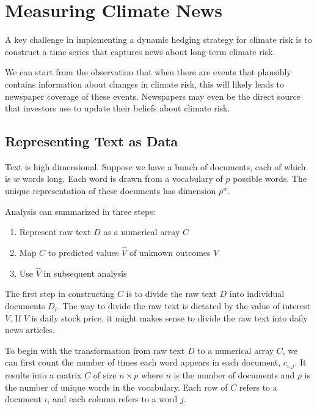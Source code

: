 \chapter{Measuring Climate News}

A key challenge in implementing a dynamic 
hedging strategy for climate risk is to 
construct a time series that captures 
news about long-term climate risk.

We can start from the observation that 
when there are events that 
plausibly contains information about changes 
in climate risk, this will likely leads 
to newspaper coverage of these events.
Newspapers may even be the direct source 
that investors use to update their beliefs
about climate risk.

\section{Representing Text as Data}
 
Text is high dimensional. 
Suppose we have a bunch of documents, each of 
which is $w$ words long. Each word is 
drawn from a vocabulary of $p$ possible 
words. The unique representation of these 
documents has dimension $p^w$. 

Analysis can 
summarized in three steps:

\begin{enumerate}
    \item Represent raw text $D$ as a numerical 
    array $C$
    \item Map $C$ to predicted 
    values $\hat{V}$ of unknown outcomes 
    $V$
    \item Use $\hat{V}$ in subsequent analysis
\end{enumerate}


The first step in constructing $C$ is 
to divide the raw text $D$ into individual documents 
$D_i$. The way to divide the raw text 
is dictated by the value of interest $V$. 
If $V$ is daily stock price, it might makes sense
to divide the raw text into daily news articles.

To begin with the transformation from raw text $D$ to
a numerical array $C$, we can first count 
the number of times each word appears in each document, $c_{i,j}$.
It results into a matrix $C$ of size $n \times p$ where $n$ is the number of documents and $p$ is 
the number of unique words in the vocabulary.
Each row of $C$ refers to a document $i$, and each column refers to a word $j$.

